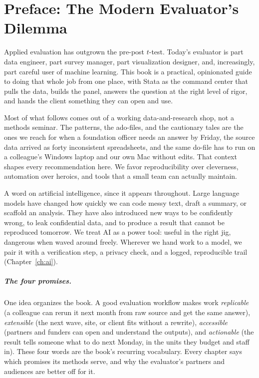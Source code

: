 \documentclass[
    a4paper,
    fontsize=10pt,
    twoside=true,
    numbers=noenddot,
]{kaobook}
\begin{document}
\mainmatter
{}

\chapter*{Preface: The Modern Evaluator's Dilemma}

\begin{fullwidthpar}
Applied evaluation has outgrown the pre-post $t$-test. Today's evaluator is part data engineer, part survey manager, part visualization designer, and, increasingly, part careful user of machine learning. This book is a practical, opinionated guide to doing that whole job from one place, with Stata as the command center that pulls the data, builds the panel, answers the question at the right level of rigor, and hands the client something they can open and use.
\end{fullwidthpar}

Most of what follows comes out of a working data-and-research shop, not a methods seminar. The patterns, the ado-files, and the cautionary tales are the ones we reach for when a foundation officer needs an answer by Friday, the source data arrived as forty inconsistent spreadsheets, and the same do-file has to run on a colleague's Windows laptop and our own Mac without edits. That context shapes every recommendation here. We favor reproducibility over cleverness, automation over heroics, and tools that a small team can actually maintain.

A word on artificial intelligence, since it appears throughout. Large language models have changed how quickly we can code messy text, draft a summary, or scaffold an analysis. They have also introduced new ways to be confidently wrong, to leak confidential data, and to produce a result that cannot be reproduced tomorrow. We treat AI as a power tool: useful in the right jig, dangerous when waved around freely. Wherever we hand work to a model, we pair it with a verification step, a privacy check, and a logged, reproducible trail (Chapter~\ref{ch:ai}).

\paragraph{The four promises.} One idea organizes the book. A good evaluation workflow makes work \emph{replicable} (a colleague can rerun it next month from raw source and get the same answer), \emph{extensible} (the next wave, site, or client fits without a rewrite), \emph{accessible} (partners and funders can open and understand the outputs), and \emph{actionable} (the result tells someone what to do next Monday, in the units they budget and staff in). These four words are the book's recurring vocabulary. Every chapter says which promises its methods serve, and why the evaluator's partners and audiences are better off for it.
\end{document}
